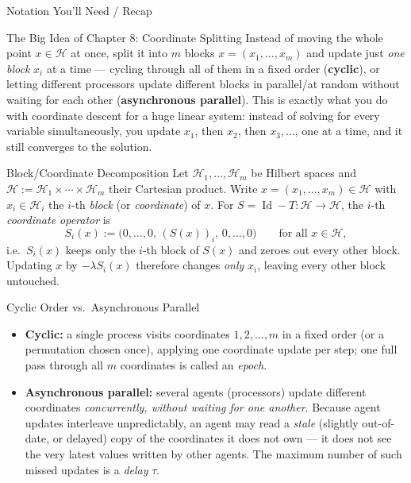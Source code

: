 \documentclass[aspectratio=169,10pt]{beamer}
\newcommand{\Hsp}{\mathcal H}
\newcommand{\Id}{\operatorname{Id}}
\begin{document}
\begin{frame}[allowframebreaks]{Notation You'll Need / Recap}
\framebreak

\begin{alertblock}{The Big Idea of Chapter 8: Coordinate Splitting}
Instead of moving the whole point $x\in\Hsp$ at once, split it into $m$ blocks $x=(x_1,\ldots,x_m)$ and update just \emph{one block} $x_i$ at a time --- cycling through all of them in a fixed order (\textbf{cyclic}), or letting different processors update different blocks in parallel/at random without waiting for each other (\textbf{asynchronous parallel}). This is exactly what you do with coordinate descent for a huge linear system: instead of solving for every variable simultaneously, you update $x_1$, then $x_2$, then $x_3,\ldots$, one at a time, and it still converges to the solution.
\end{alertblock}

\begin{block}{Block/Coordinate Decomposition}
Let $\Hsp_1,\ldots,\Hsp_m$ be Hilbert spaces and $\Hsp := \Hsp_1\times\cdots\times\Hsp_m$ their Cartesian product. Write $x=(x_1,\ldots,x_m)\in\Hsp$ with $x_i\in\Hsp_i$ the $i$-th \emph{block} (or \emph{coordinate}) of $x$. For $S=\Id-T:\Hsp\to\Hsp$, the $i$-th \emph{coordinate operator} is
\[
  S_i(x) := \bigl(0,\ldots,0,\, (S(x))_i,\, 0,\ldots,0\bigr) \qquad \text{for all } x\in\Hsp,
\]
i.e.\ $S_i(x)$ keeps only the $i$-th block of $S(x)$ and zeroes out every other block. Updating $x$ by $-\lambda S_i(x)$ therefore changes \emph{only} $x_i$, leaving every other block untouched.
\end{block}

\begin{block}{Cyclic Order vs.\ Asynchronous Parallel}
\begin{itemize}
  \item \textbf{Cyclic:} a single process visits coordinates $1,2,\ldots,m$ in a fixed order (or a permutation chosen once), applying one coordinate update per step; one full pass through all $m$ coordinates is called an \emph{epoch}.
  \item \textbf{Asynchronous parallel:} several agents (processors) update different coordinates \emph{concurrently, without waiting for one another}. Because agent updates interleave unpredictably, an agent may read a \emph{stale} (slightly out-of-date, or delayed) copy of the coordinates it does not own --- it does not see the very latest values written by other agents. The maximum number of such missed updates is a \emph{delay} $\tau$.
\end{itemize}
\end{block}

\end{frame}
\end{document}

